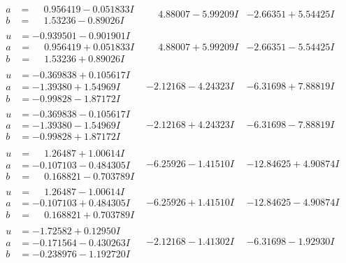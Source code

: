 \documentclass[1p]{elsarticle_modified}
\theoremstyle{definition}
\begin{document}
$$\begin{array}{c|c|c}
\begin{aligned}
a &= \phantom{-}0.956419 - 0.051833 I \\
b &= \phantom{-}1.53236 - 0.89026 I\end{aligned}
 & \phantom{-}4.88007 - 5.99209 I & -2.66351 + 5.54425 I \\ \hline\begin{aligned}
u &= -0.939501 - 0.901901 I \\
a &= \phantom{-}0.956419 + 0.051833 I \\
b &= \phantom{-}1.53236 + 0.89026 I\end{aligned}
 & \phantom{-}4.88007 + 5.99209 I & -2.66351 - 5.54425 I \\ \hline\begin{aligned}
u &= -0.369838 + 0.105617 I \\
a &= -1.39380 + 1.54969 I \\
b &= -0.99828 - 1.87172 I\end{aligned}
 & -2.12168 - 4.24323 I & -6.31698 + 7.88819 I \\ \hline\begin{aligned}
u &= -0.369838 - 0.105617 I \\
a &= -1.39380 - 1.54969 I \\
b &= -0.99828 + 1.87172 I\end{aligned}
 & -2.12168 + 4.24323 I & -6.31698 - 7.88819 I \\ \hline\begin{aligned}
u &= \phantom{-}1.26487 + 1.00614 I \\
a &= -0.107103 - 0.484305 I \\
b &= \phantom{-}0.168821 - 0.703789 I\end{aligned}
 & -6.25926 - 1.41510 I & -12.84625 + 4.90874 I \\ \hline\begin{aligned}
u &= \phantom{-}1.26487 - 1.00614 I \\
a &= -0.107103 + 0.484305 I \\
b &= \phantom{-}0.168821 + 0.703789 I\end{aligned}
 & -6.25926 + 1.41510 I & -12.84625 - 4.90874 I \\ \hline\begin{aligned}
u &= -1.72582 + 0.12950 I \\
a &= -0.171564 - 0.430263 I \\
b &= -0.238976 - 1.192720 I\end{aligned}
 & -2.12168 - 1.41302 I & -6.31698 - 1.92930 I \\ \hline\begin{aligned}

\end{aligned}
\end{array}$$
\end{document}
